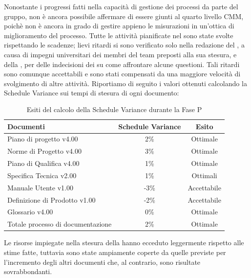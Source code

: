 Nonostante i progressi fatti nella capacità di gestione dei processi da parte del gruppo, non è ancora possibile affermare di essere 
giunti al quarto livello CMM, poichè non è ancora in grado di gestire appieno le misurazioni in un'ottica di miglioramento
del processo.
Tutte le attività pianificate nel  sono state svolte rispettando le scadenze; lievi ritardi si sono verificato 
solo nella redazione del , a causa di impegni universitari dei membri del team preposti alla sua stesura, e della 
, per delle indecisioni dei  su come affrontare alcune questioni. Tali ritardi sono 
comunque accettabili e sono stati compensati da una maggiore velocità di svolgimento di altre attività.
Riportiamo di seguito i valori ottenuti calcolando la Schedule Variance sui tempi di stesura di ogni documento:
			\begin{table}[H]
					\centering
					\begin{tabu}{| l | c | c |}
							\hline
							Documenti 							& Schedule Variance	& Esito		\\ \hline \hline
							
							Piano di progetto v4.00				& 2\% 		& Ottimale  \\ \hline
							Norme di Progetto v4.00 			& 3\%		& Ottimale  \\ \hline
							Piano di Qualifica v4.00 			& 1\%		& Ottimale  \\ \hline
							Specifica Tecnica v2.00 			& 1\%		& Ottimali  \\ \hline
							Manuale Utente v1.00 			& -3\%		& Accettabile  \\ \hline
							Definizione di Prodotto v1.00 			& -2\%		& Accettabile  \\ \hline
							Glossario v4.00					 	& 0\% 		& Ottimale  \\ \hline
							Totale processo di documentazione & 2\% & Ottimale \\ \hline
						\end{tabu}
					\caption{Esiti del calcolo della Schedule Variance durante la Fase P}
				\end{table}
Le risorse impiegate nella stesura della  hanno ecceduto leggermente rispetto alle stime fatte, tuttavia sono state ampiamente coperte 
da quelle previste per l'incremento degli altri documenti che, al contrario, sono risultate sovrabbondanti.
